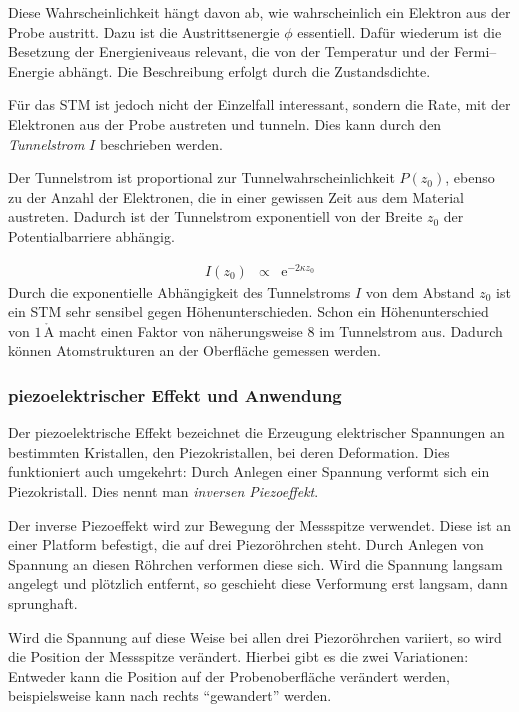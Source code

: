 \documentclass[12pt,a4paper]{scrartcl}
\numberwithin{equation}{section} %
\begin{document}
Diese Wahrscheinlichkeit hängt davon ab, wie wahrscheinlich ein Elektron aus der Probe austritt. Dazu ist die Austrittsenergie $\phi$ essentiell. Dafür wiederum ist die Besetzung der Energieniveaus relevant, die von der Temperatur und der Fermi--Energie abhängt. Die Beschreibung erfolgt durch die Zustandsdichte.

Für das STM ist jedoch nicht der Einzelfall interessant, sondern die Rate, mit der Elektronen aus der Probe austreten und tunneln. Dies kann durch den \emph{Tunnelstrom} $I$ beschrieben werden.

Der Tunnelstrom ist proportional zur Tunnelwahrscheinlichkeit $P(z_0)$, ebenso zu der Anzahl der Elektronen, die in einer gewissen Zeit aus dem Material austreten. Dadurch ist der Tunnelstrom exponentiell von der Breite $z_0$ der Potentialbarriere abhängig.

\begin{eqnarray}
	I(z_0) &\propto& \mathrm e^{-2\kappa z_0} \label{eq:Tunnelstrom}
\end{eqnarray}
Durch die exponentielle Abhängigkeit des Tunnelstroms $I$ von dem Abstand $z_0$ ist ein STM sehr sensibel gegen Höhenunterschieden. Schon ein Höhenunterschied von $1\,\mathrm{\mathring{A}}$ macht einen Faktor von näherungsweise $8$ im Tunnelstrom aus. \cite{Anleitung} Dadurch können Atomstrukturen an der Oberfläche gemessen werden.

\hypertarget{piezoelektrischer-effekt-und-anwendung}{%
\subsubsection{piezoelektrischer Effekt und Anwendung}\label{piezoelektrischer-effekt-und-anwendung}}

Der piezoelektrische Effekt bezeichnet die Erzeugung elektrischer Spannungen an bestimmten Kristallen, den Piezokristallen, bei deren Deformation. Dies funktioniert auch umgekehrt: Durch Anlegen einer Spannung verformt sich ein Piezokristall. Dies nennt man \emph{inversen Piezoeffekt}.

Der inverse Piezoeffekt wird zur Bewegung der Messspitze verwendet. Diese ist an einer Platform befestigt, die auf drei Piezoröhrchen steht. Durch Anlegen von Spannung an diesen Röhrchen verformen diese sich. Wird die Spannung langsam angelegt und plötzlich entfernt, so geschieht diese Verformung erst langsam, dann sprunghaft.

Wird die Spannung auf diese Weise bei allen drei Piezoröhrchen variiert, so wird die Position der Messspitze verändert. Hierbei gibt es die zwei Variationen: Entweder kann die Position auf der Probenoberfläche verändert werden, beispielsweise kann nach rechts ``gewandert'' werden.
\end{document}
